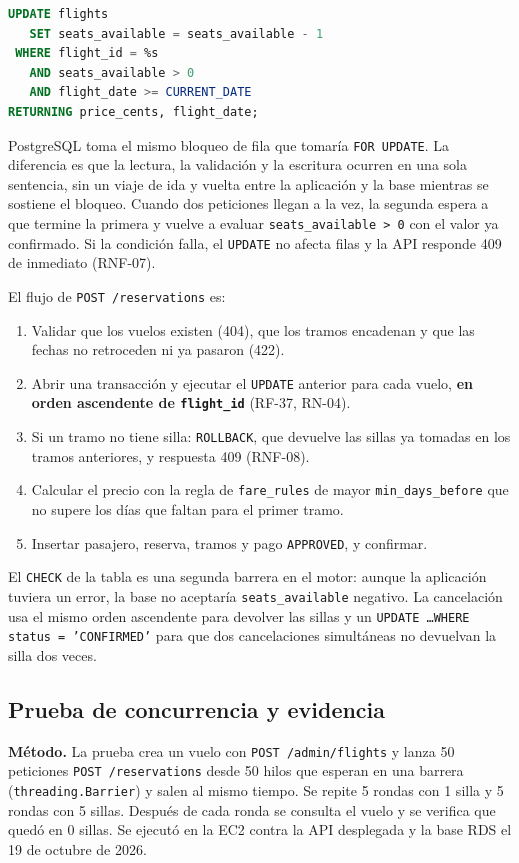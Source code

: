 \documentclass[10pt,letterpaper]{article}
\begin{document}
\begin{lstlisting}[language=SQL,caption={Descuento de una silla por tramo, dentro de la transacción de la reserva.}]
UPDATE flights
   SET seats_available = seats_available - 1
 WHERE flight_id = %s
   AND seats_available > 0
   AND flight_date >= CURRENT_DATE
RETURNING price_cents, flight_date;
\end{lstlisting}

PostgreSQL toma el mismo bloqueo de fila que tomaría \texttt{FOR UPDATE}. La diferencia es que la lectura, la validación y la escritura ocurren en una sola sentencia, sin un viaje de ida y vuelta entre la aplicación y la base mientras se sostiene el bloqueo. Cuando dos peticiones llegan a la vez, la segunda espera a que termine la primera y vuelve a evaluar \texttt{seats\_available > 0} con el valor ya confirmado. Si la condición falla, el \texttt{UPDATE} no afecta filas y la API responde 409 de inmediato (RNF-07).

El flujo de \texttt{POST /reservations} es:
\begin{enumerate}
  \item Validar que los vuelos existen (404), que los tramos encadenan y que las fechas no retroceden ni ya pasaron (422).
  \item Abrir una transacción y ejecutar el \texttt{UPDATE} anterior para cada vuelo, \textbf{en orden ascendente de \texttt{flight\_id}} (RF-37, RN-04).
  \item Si un tramo no tiene silla: \texttt{ROLLBACK}, que devuelve las sillas ya tomadas en los tramos anteriores, y respuesta 409 (RNF-08).
  \item Calcular el precio con la regla de \texttt{fare\_rules} de mayor \texttt{min\_days\_before} que no supere los días que faltan para el primer tramo.
  \item Insertar pasajero, reserva, tramos y pago \texttt{APPROVED}, y confirmar.
\end{enumerate}

El \texttt{CHECK} de la tabla es una segunda barrera en el motor: aunque la aplicación tuviera un error, la base no aceptaría \texttt{seats\_available} negativo. La cancelación usa el mismo orden ascendente para devolver las sillas y un \texttt{UPDATE \ldots WHERE status = 'CONFIRMED'} para que dos cancelaciones simultáneas no devuelvan la silla dos veces.

\subsection{Prueba de concurrencia y evidencia}
\textbf{Método.} La prueba crea un vuelo con \texttt{POST /admin/flights} y lanza 50 peticiones \texttt{POST /reservations} desde 50 hilos que esperan en una barrera (\texttt{threading.Barrier}) y salen al mismo tiempo. Se repite 5 rondas con 1 silla y 5 rondas con 5 sillas. Después de cada ronda se consulta el vuelo y se verifica que quedó en 0 sillas. Se ejecutó en la EC2 contra la API desplegada y la base RDS el 19 de octubre de 2026.
\end{document}
